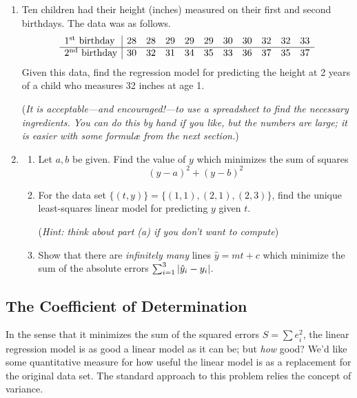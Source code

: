 \begin{exercises}{}{}
\begin{enumerate}
	  
	  \item Ten children had their height (inches) measured on their first and second birthdays. The data was as follows.
	  \[
	  	\begin{array}{l|cccccccccc}
	  		\text{1\textsuperscript{st}{} birthday}&28&28&29&29&29&30&30&32&32&33\\\hline
	  		\text{2\textsuperscript{nd}{} birthday}&30&32&31&34&35&33&36&37&35&37
	  	\end{array}
	  \]
	  Given this data, find the regression model for predicting the height at 2 years of a child who measures 32 inches at age 1. %
	  \par
	  (\emph{It is acceptable---and encouraged!---to use a spreadsheet to find the necessary ingredients. You can do this by hand if you like, but the numbers are large; it is easier with some formulæ from the next section.})
	  
	  \item\begin{enumerate}
	    \item Let $a,b$ be given. Find the value of $y$ which minimizes the sum of squares
	    \[
	    	(y-a)^2+(y-b)^2
	    \]
	    \item For the data set $\bigl\{(t,y)\bigr\} =\bigl\{(1,1),(2,1),(2,3)\bigr\}$, find the unique least-squares linear model for predicting $y$ given $t$.\par
	    (\emph{Hint: think about part (a) if you don't want to compute})
	    \item	Show that there are \emph{infinitely many} lines $\hat y=mt+c$ which minimize the sum of the absolute errors $\sum_{i=1}^3\left| \hat y_i-y_i\right|$.
	  \end{enumerate}
	\end{enumerate}
\end{exercises}




\clearpage


\subsection{The Coefficient of Determination}

In the sense that it minimizes the sum of the squared errors $S=\sum e_i^2$, the linear regression model is as good a linear model as it can be; but \emph{how} good? We'd like some quantitative measure for how useful the linear model is as a replacement for the original data set. The standard approach to this problem relies the concept of variance.

